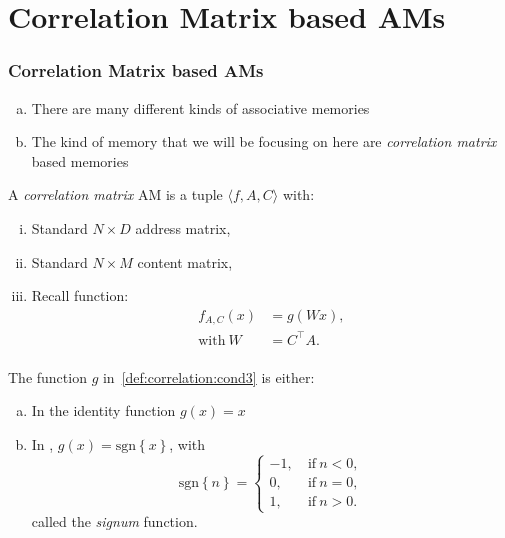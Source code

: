 \documentclass{beamer}
\begin{document}
\section{Correlation Matrix based AMs}
\begin{frame}
\frametitle{Correlation Matrix based AMs}
\begin{enumerate}[(a)]
    \item There are many different kinds of associative memories
    \item The kind of memory that we will be focusing on here are 
    \textit{correlation matrix} based memories \parencites{nakano_associatron-model_1972,amari_learning_1972,hopfield_neural_1982,hopfield_neurons_1984,anderson_correlation_1988}
\end{enumerate}

\begin{definition}
    A \textit{correlation matrix} AM is a tuple $\langle f, A, C \rangle$
    with:
    \begin{enumerate}[(i)]
        \item Standard $N \times D$ address matrix,
        \item Standard $N \times M$ content matrix,
        \item Recall function:
        \begin{align*}
        f_{A, C} (x) &= g(W x), \\
        \text{with}~W &= C^\top A. \\
        \end{align*} \label{def:correlation:cond3}
    \end{enumerate}
\end{definition}

\end{frame}

\begin{frame}
    The function $g$ in~\autoref{def:correlation:cond3} is either:
    \begin{enumerate}[(a)]
        \item In \textcite{anderson_correlation_1988} the identity function
        $g(x) = x$
        \item In \textcites{amari_learning_1972,nakano_associatron-model_1972,hopfield_neural_1982},
        $g(x) = \text{sgn}\left\{x\right\}$, with
        $$
        \text{sgn} \left\{n\right\} = \begin{cases}
            -1,~&\text{if}~n < 0, \\
            0,~&\text{if}~n= 0, \\
            1,~&\text{if}~ n > 0.
        \end{cases}
        $$
        called the \textit{signum} function.
    \end{enumerate}
\end{frame}
\end{document}
